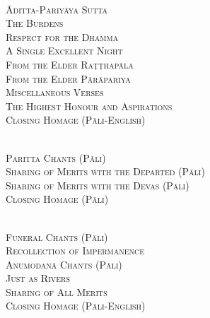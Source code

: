 \begin{center}
  \medskip

  {\libertinusFont\selectfont\textbf{\textsc{}}}\\

  \textsc{Āditta-Pariyāya Sutta\\
    The Burdens\\
    Respect for the Dhamma\\
    A Single Excellent Night\\
    From the Elder Raṭṭhapāla\\
    From the Elder Pārāpariya\\
    Miscellaneous Verses\\
    The Highest Honour and Aspirations\\
    Closing Homage (Pāli-English)}\\ %

  \medskip

  {\libertinusFont\selectfont\textbf{\textsc{}}}\\

  \textsc{Paritta Chants (Pāli)\\
    Sharing of Merits with the Departed (Pāli)\\
    Sharing of Merits with the Devas (Pāli)\\
    Closing Homage (Pāli)}\\

  \medskip

  {\libertinusFont\selectfont\textbf{\textsc{}}}\\

  \textsc{Funeral Chants (Pāli)\\
    Recollection of Impermanence\\
    Anumodanā Chants (Pāli)\\
    Just as Rivers\\
    Sharing of All Merits\\
    Closing Homage (Pāli-English)}\\

\end{center}
